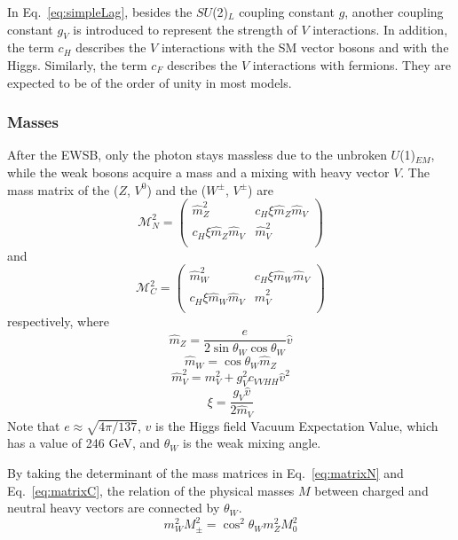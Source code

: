 In Eq.~\ref{eq:simpleLag}, besides the $SU$(2)$_L$ coupling constant $g$, another coupling constant $g_V$ is introduced to represent the strength of $V$ interactions. In addition, the term $c_H$ describes the $V$ interactions with the SM vector bosons and with the Higgs. Similarly, the term $c_F$ describes the $V$ interactions with fermions. They are expected to be of the order of unity in most models. 

\subsubsection*{Masses}

After the EWSB, only the photon stays massless due to the unbroken $U$(1)$_{EM}$, while the weak bosons acquire a mass and a mixing with heavy vector $V$. The mass matrix of the ($Z$, $V^0$) and the ($W^\pm$, $V^\pm$) are 
\begin{equation} \label{eq:matrixN}
  \mathcal{M}_N^2 =
  \begin{pmatrix}
    \hat{m}_Z^2 &
    c_H\xi\hat{m}_Z\hat{m}_V \\
    c_H\xi\hat{m}_Z\hat{m}_V &
    \hat{m}_V^2 \\
  \end{pmatrix}
\end{equation}
and
\begin{equation} \label{eq:matrixC}
  \mathcal{M}_C^2 =
  \begin{pmatrix}
    \hat{m}_W^2 &
    c_H\xi\hat{m}_W\hat{m}_V \\
    c_H\xi\hat{m}_W\hat{m}_V &
    \hat{m}_V^2 \\
  \end{pmatrix}
\end{equation}
respectively, where
\[\hat{m}_Z = \frac{e}{2\sin\theta_W\cos\theta_W}\hat{v}\]
\[\hat{m}_W = \cos\theta_W\hat{m}_Z\]
\[\hat{m}_V^2 = m_V^2 + g_V^2c_{VVHH}\hat{v}^2\]
\[\xi = \frac{g_V\hat{v}}{2\hat{m}_V}\]
Note that $e \approx \sqrt{4\pi/137}$, $\hat{v}$ is the Higgs field Vacuum Expectation Value, which has a value of 246 GeV, and $\theta_W$ is the weak mixing angle.

By taking the determinant of the mass matrices in Eq.~\ref{eq:matrixN} and Eq.~\ref{eq:matrixC}, the relation of the physical masses $M$ between charged and neutral heavy vectors are connected by $\theta_W$.
\begin{equation}
  m_W^2M_\pm^2 = \cos^2\theta_Wm_Z^2M_0^2
\end{equation}


